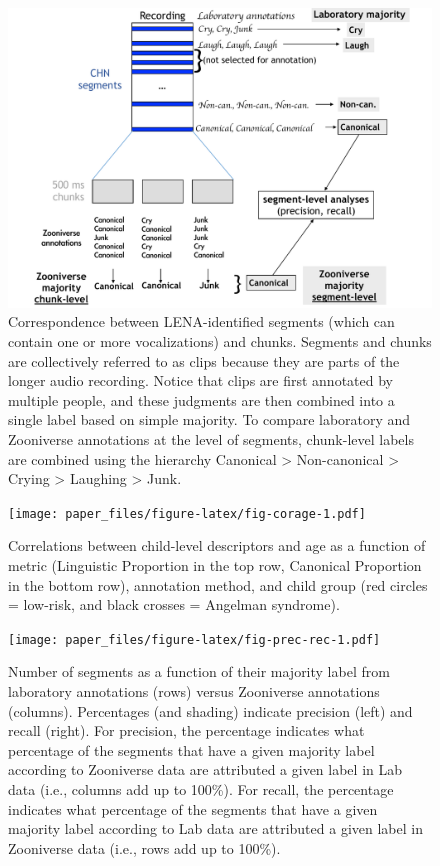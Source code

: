 \documentclass[
  english,
  ,man]{apa6}
\begin{document}
\begin{figure}
\centering
\includegraphics{fig_levels.pdf}
\caption{\label{fig:fig-process}Correspondence between LENA-identified segments (which can contain one or more vocalizations) and chunks. Segments and chunks are collectively referred to as clips because they are parts of the longer audio recording. Notice that clips are first annotated by multiple people, and these judgments are then combined into a single label based on simple majority. To compare laboratory and Zooniverse annotations at the level of segments, chunk-level labels are combined using the hierarchy Canonical \textgreater{} Non-canonical \textgreater{} Crying \textgreater{} Laughing \textgreater{} Junk.}
\end{figure}

\begin{figure}
\centering
\texttt{[image: paper\_files/figure-latex/fig-corage-1.pdf]}
\caption{\label{fig:fig-corage}Correlations between child-level descriptors and age as a function of metric (Linguistic Proportion in the top row, Canonical Proportion in the bottom row), annotation method, and child group (red circles = low-risk, and black crosses = Angelman syndrome).}
\end{figure}

\begin{figure}
\centering
\texttt{[image: paper\_files/figure-latex/fig-prec-rec-1.pdf]}
\caption{\label{fig:fig-prec-rec}Number of segments as a function of their majority label from laboratory annotations (rows) versus Zooniverse annotations (columns). Percentages (and shading) indicate precision (left) and recall (right). For precision, the percentage indicates what percentage of the segments that have a given majority label according to Zooniverse data are attributed a given label in Lab data (i.e., columns add up to 100\%). For recall, the percentage indicates what percentage of the segments that have a given majority label according to Lab data are attributed a given label in Zooniverse data (i.e., rows add up to 100\%).}
\end{figure}
\end{document}
